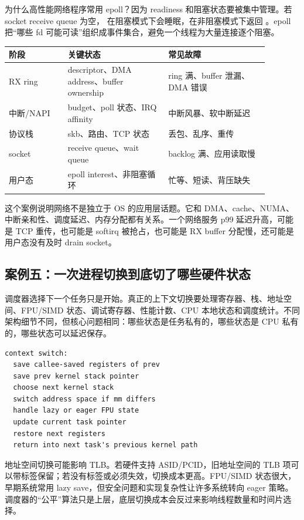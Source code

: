 为什么高性能网络程序常用 epoll？因为 readiness 和阻塞状态要被集中管理。若 socket receive queue 为空， 在阻塞模式下会睡眠，在非阻塞模式下返回 。epoll 把“哪些 fd 可能可读”组织成事件集合，避免一个线程为大量连接逐个阻塞。

\begin{longtable}{p{0.2\linewidth}p{0.34\linewidth}p{0.34\linewidth}}
\toprule
阶段 & 关键状态 & 常见故障 \\
\midrule
RX ring & descriptor、DMA address、buffer ownership & ring 满、buffer 泄漏、DMA 错误 \\
中断/NAPI & budget、poll 状态、IRQ affinity & 中断风暴、软中断延迟 \\
协议栈 & skb、路由、TCP 状态 & 丢包、乱序、重传 \\
socket & receive queue、wait queue & backlog 满、应用读取慢 \\
用户态 & epoll interest、非阻塞循环 & 忙等、短读、背压缺失 \\
\bottomrule
\end{longtable}

这个案例说明网络不是独立于 OS 的应用层话题。它和 DMA、cache、NUMA、中断亲和性、调度延迟、内存分配都有关系。一个网络服务 p99 延迟升高，可能是 TCP 重传，也可能是 softirq 被抢占，也可能是 RX buffer 分配慢，还可能是用户态没有及时 drain socket。

\subsection{案例五：一次进程切换到底切了哪些硬件状态}

调度器选择下一个任务只是开始。真正的上下文切换要处理寄存器、栈、地址空间、FPU/SIMD 状态、调试寄存器、性能计数、CPU 本地状态和调度统计。不同架构细节不同，但核心问题相同：哪些状态是任务私有的，哪些状态是 CPU 私有的，哪些状态可以延迟保存。

\begin{lstlisting}
context switch:
  save callee-saved registers of prev
  save prev kernel stack pointer
  choose next kernel stack
  switch address space if mm differs
  handle lazy or eager FPU state
  update current task pointer
  restore next registers
  return into next task's previous kernel path
\end{lstlisting}

地址空间切换可能影响 TLB。若硬件支持 ASID/PCID，旧地址空间的 TLB 项可以带标签保留；若没有标签或必须失效，切换成本更高。FPU/SIMD 状态很大，早期系统常用 lazy save，但安全问题和实现复杂性让许多系统转向 eager 策略。调度器的“公平”算法只是上层，底层切换成本会反过来影响线程数量和时间片选择。

